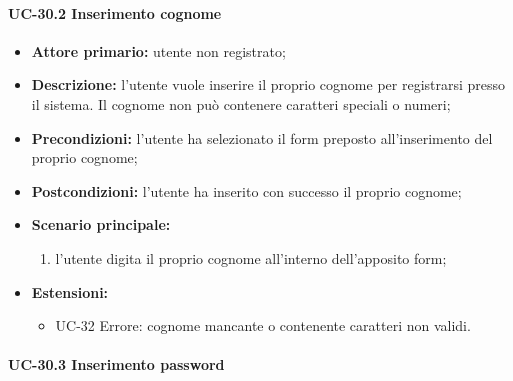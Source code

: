 \paragraph{UC-30.2 Inserimento cognome}

	\begin{itemize}
		\item \textbf{Attore primario:} utente non registrato;

		\item \textbf{Descrizione:} l'utente vuole inserire il proprio cognome per registrarsi presso il sistema. Il cognome non può contenere caratteri speciali o numeri;

		\item \textbf{Precondizioni:} l'utente ha selezionato il form preposto all'inserimento del proprio cognome;

		\item \textbf{Postcondizioni:} l'utente ha inserito con successo il proprio cognome;

		\item \textbf{Scenario principale:}
			\begin{enumerate}
		  		\item l'utente digita il proprio cognome all'interno dell'apposito form;
	  		\end{enumerate}
		\item \textbf{Estensioni:}
	  		\begin{itemize}
		  		\item UC-32 Errore: cognome mancante o contenente caratteri non validi.
	  		\end{itemize}
	\end{itemize}

\paragraph{UC-30.3 Inserimento password}


